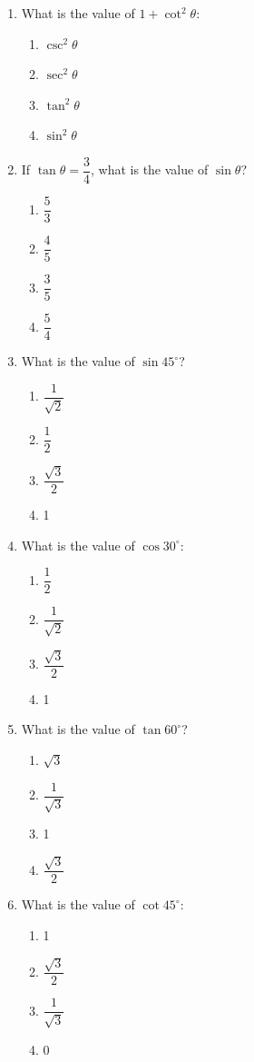 \documentclass[11pt]{article}
\begin{document}
\begin{enumerate}[label=\textbf{\arabic*.}, start=204, leftmargin=2em]
\item What is the value of $1 + \cot^2\theta$:
\begin{enumerate}[label=(\Alph*)] \item $\csc^2\theta$ \item $\sec^2\theta$ \item $\tan^2\theta$ \item $\sin^2\theta$ \end{enumerate}

\item If $\tan\theta = \dfrac{3}{4}$, what is the value of $\sin\theta$?
\begin{enumerate}[label=(\Alph*)] \item $\dfrac{5}{3}$ \item $\dfrac{4}{5}$ \item $\dfrac{3}{5}$ \item $\dfrac{5}{4}$ \end{enumerate}

\item What is the value of $\sin 45^\circ$?
\begin{enumerate}[label=(\Alph*)] \item $\dfrac{1}{\sqrt{2}}$ \item $\dfrac{1}{2}$ \item $\dfrac{\sqrt{3}}{2}$ \item 1 \end{enumerate}

\item What is the value of $\cos 30^\circ$:
\begin{enumerate}[label=(\Alph*)] \item $\dfrac{1}{2}$ \item $\dfrac{1}{\sqrt{2}}$ \item $\dfrac{\sqrt{3}}{2}$ \item 1 \end{enumerate}

\item What is the value of $\tan 60^\circ$?
\begin{enumerate}[label=(\Alph*)] \item $\sqrt{3}$ \item $\dfrac{1}{\sqrt{3}}$ \item 1 \item $\dfrac{\sqrt{3}}{2}$ \end{enumerate}

\item What is the value of $\cot 45^\circ$:
\begin{enumerate}[label=(\Alph*)] \item 1 \item $\dfrac{\sqrt{3}}{2}$ \item $\dfrac{1}{\sqrt{3}}$ \item 0 \end{enumerate}


\end{enumerate}
\end{document}
